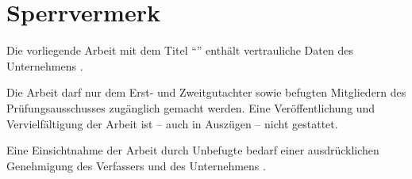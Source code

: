 
\chapter*{Sperrvermerk}

Die vorliegende Arbeit mit dem Titel "`\myTitle"' enthält vertrauliche Daten des Unternehmens \myCompany.

Die Arbeit darf nur dem Erst- und Zweitgutachter sowie befugten Mitgliedern des Prüfungsausschusses zugänglich gemacht werden.
Eine Veröffentlichung und Vervielfältigung der Arbeit ist -- auch in Auszügen -- nicht gestattet.

Eine Einsichtnahme der Arbeit durch Unbefugte bedarf einer ausdrücklichen Genehmigung des Verfassers und des Unternehmens \myCompany.
